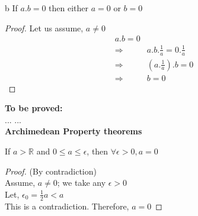 \documentclass{article}
\newcommand{\Rw}{\Rightarrow}
\begin{document}
\begin{theorem}{b}{}
    If $a.b=0$ then either $a=0$ or $b=0$
    \begin{proof}
        Let us assume, $a\neq 0$
        \begin{align*}
            a.b=0\\
            \Rw \; & a.b.\frac{1}{a}=0.\frac{1}{a}\\
            \Rw \; & (a.\frac{1}{a}).b=0\\
            \Rw \; & b=0
        \end{align*}
    \end{proof}
\end{theorem}
\textbf{To be proved:}\\
... ...\\
\textbf{Archimedean Property theorems}
\begin{theorem}{}{}
    If $a>\mathbb{R}$ and $0\leq a \leq \epsilon$, then $\forall \epsilon > 0, a=0$
    \begin{proof}
        (By contradiction)\\
        Assume, $a \neq 0$; we take any $\epsilon >0$\\
        Let, $\epsilon_0 =\frac{1}{2}a < a$\\
        This is a contradiction. Therefore, $a=0$
    \end{proof}
\end{theorem}
\end{document}
